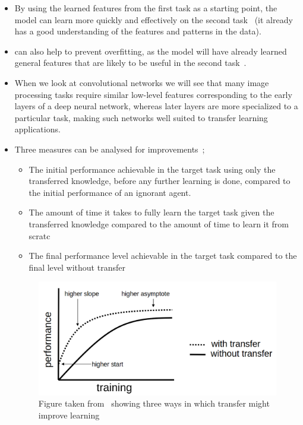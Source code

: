 \documentclass[11pt]{article}
\begin{document}
\begin{itemize}
    \item By using the learned features from the first task as a starting point, the model can learn more quickly and effectively on the second task~\cite{geeks-transfer-learning} (it already has a good understanding of the features and patterns in the data).
    \item can also help to prevent overfitting, as the model will have already learned general features that are likely to be useful in the second task~\cite{geeks-transfer-learning}.
    \item When we look at convolutional networks we will see that many image processing tasks require similar low-level features corresponding to the early layers of a deep neural network, whereas later layers are more specialized to a particular task, making such networks well suited to transfer learning applications.~\cite{deep-learning-book}
    \item Three measures can be analysed for improvements~\cite{torrey-handbook};

          \begin{itemize}
              \item The initial performance achievable in the target task using only the transferred knowledge, before any further learning is done, compared to the initial performance of an ignorant agent.
              \item The amount of time it takes to fully learn the target task given the transferred knowledge compared to the amount of time to learn it from scratc
              \item The final performance level achievable in the target task compared to the final level
                    without transfer
          \end{itemize}

          \begin{figure}[H]
              \centering
              \includegraphics[width=0.7\linewidth]{images/performance.png}
              \caption{Figure taken from~\cite{torrey-handbook} showing three ways in which transfer might improve learning}
              \label{fig:performance}
          \end{figure}


\end{itemize}
\end{document}
